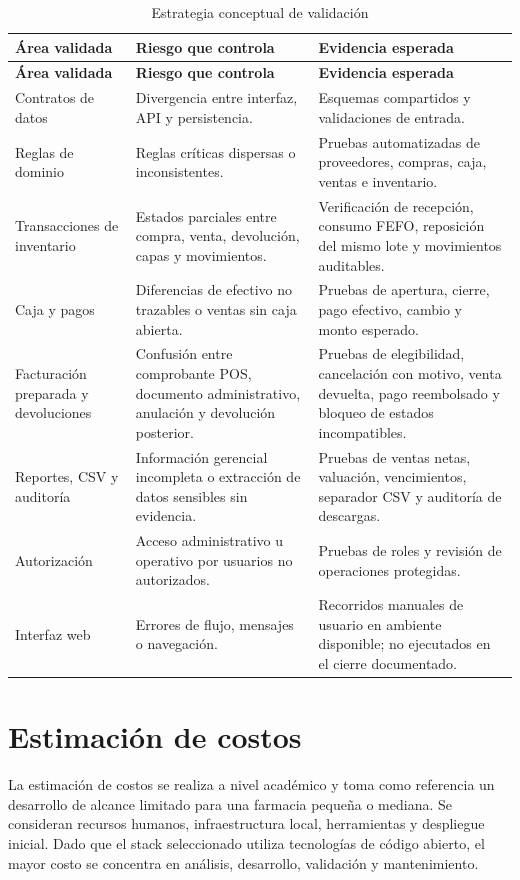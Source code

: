 \begin{longtable}{p{}p{}p{}}
\caption{Estrategia conceptual de validación}\\
\toprule
\textbf{Área validada} & \textbf{Riesgo que controla} & \textbf{Evidencia esperada}\\
\midrule
\endfirsthead
\toprule
\textbf{Área validada} & \textbf{Riesgo que controla} & \textbf{Evidencia esperada}\\
\midrule
\endhead
Contratos de datos & Divergencia entre interfaz, API y persistencia. & Esquemas compartidos y validaciones de entrada.\\
Reglas de dominio & Reglas críticas dispersas o inconsistentes. & Pruebas automatizadas de proveedores, compras, caja, ventas e inventario.\\
Transacciones de inventario & Estados parciales entre compra, venta, devolución, capas y movimientos. & Verificación de recepción, consumo FEFO, reposición del mismo lote y movimientos auditables.\\
Caja y pagos & Diferencias de efectivo no trazables o ventas sin caja abierta. & Pruebas de apertura, cierre, pago efectivo, cambio y monto esperado.\\
Facturación preparada y devoluciones & Confusión entre comprobante POS, documento administrativo, anulación y devolución posterior. & Pruebas de elegibilidad, cancelación con motivo, venta devuelta, pago reembolsado y bloqueo de estados incompatibles.\\
Reportes, CSV y auditoría & Información gerencial incompleta o extracción de datos sensibles sin evidencia. & Pruebas de ventas netas, valuación, vencimientos, separador CSV y auditoría de descargas.\\
Autorización & Acceso administrativo u operativo por usuarios no autorizados. & Pruebas de roles y revisión de operaciones protegidas.\\
Interfaz web & Errores de flujo, mensajes o navegación. & Recorridos manuales de usuario en ambiente disponible; no ejecutados en el cierre documentado.\\
\bottomrule
\end{longtable}

\section{Estimación de costos}

La estimación de costos se realiza a nivel académico y toma como referencia un desarrollo de alcance limitado para una farmacia pequeña o mediana. Se consideran recursos humanos, infraestructura local, herramientas y despliegue inicial. Dado que el stack seleccionado utiliza tecnologías de código abierto, el mayor costo se concentra en análisis, desarrollo, validación y mantenimiento.

